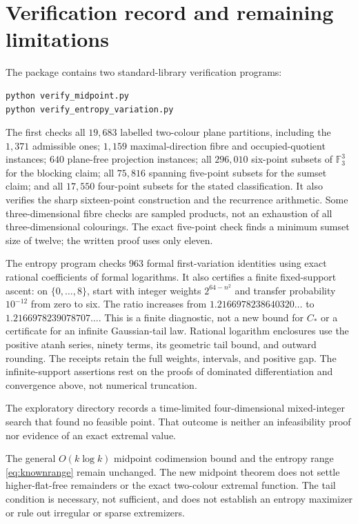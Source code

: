 \documentclass[11pt]{article}
\theoremstyle{remark}\newtheorem{remark}[theorem]{Remark}
\newcommand{\F}{\mathbb F_3}
\begin{document}
\section{Verification record and remaining limitations}

The package contains two standard-library verification programs:
\begin{verbatim}
python verify_midpoint.py
python verify_entropy_variation.py
\end{verbatim}
The first checks all $19{,}683$ labelled two-colour plane partitions,
including the $1{,}371$ admissible ones; $1{,}159$ maximal-direction fibre
and occupied-quotient instances; $640$ plane-free projection instances;
all $296{,}010$ six-point subsets of $\F^3$ for the blocking claim; all
$75{,}816$ spanning five-point subsets for the sumset claim; and all
$17{,}550$ four-point subsets for the stated classification. It also verifies
the sharp sixteen-point construction and the recurrence arithmetic.
Some three-dimensional fibre checks are sampled products, not an
exhaustion of all three-dimensional colourings. The exact five-point check
finds a minimum sumset size of twelve; the written proof uses only eleven.

The entropy program checks $963$ formal first-variation identities using
exact rational coefficients of formal logarithms. It also certifies a
finite fixed-support ascent: on $\{0,\ldots,8\}$, start with integer weights
$2^{64-n^2}$ and transfer probability $10^{-12}$ from zero to six. The ratio
increases from $1.2166978238640320\ldots$ to $1.2166978239078707\ldots$.
This is a finite diagnostic, not a new bound for $C_*$ or a certificate for
an infinite Gaussian-tail law. Rational logarithm enclosures use the
positive atanh series, ninety terms, its geometric tail bound, and outward
rounding. The receipts retain the full weights, intervals, and positive gap.
The infinite-support assertions rest on the proofs of dominated
differentiation and convergence above, not numerical truncation.

The exploratory directory records a time-limited four-dimensional
mixed-integer search that found no feasible point. That outcome is neither
an infeasibility proof nor evidence of an exact extremal value.

The general $O(k\log k)$ midpoint codimension bound and the entropy range
\eqref{eq:knownrange} remain unchanged. The new midpoint theorem does not
settle higher-flat-free remainders or the exact two-colour extremal
function. The tail condition is necessary, not sufficient, and does not
establish an entropy maximizer or rule out irregular or sparse extremizers.
\end{document}
